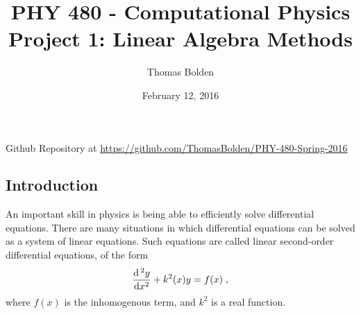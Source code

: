 \documentclass[11pt]{article}
\title{PHY 480 - Computational Physics \\ Project 1: Linear Algebra Methods}
\author{Thomas Bolden}
\date{February 12, 2016}
\begin{document}
\maketitle

\thispagestyle{empty}

\centerline{Github Repository at \href{https://github.com/ThomasBolden/PHY-480-Spring-2016}{https://github.com/ThomasBolden/PHY-480-Spring-2016}}

\begin{abstract}

    \lipsum[1-1]

\end{abstract}

\vspace{\fill}
\tableofcontents

 \vspace{2cm}

\pagebreak

\setcounter{page}{1}

\subsection{Introduction}

    An important skill in physics is being able to efficiently solve differential equations. There are many situations in which differential equations can be solved as a system of linear equations. Such equations are called linear second-order differential equations, of the form
    \begin{equation} \dfrac{\dif\,^2 y}{\dif x^2} + k^2(x) y = f(x) \; , \end{equation}
    where $f(x)$ is the inhomogenous term, and $k^2$ is a real function. \\
\end{document}
